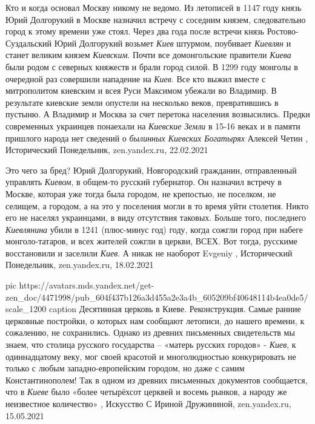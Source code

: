 Кто и когда основал Москву никому не ведомо. Из летописей в 1147 году
князь Юрий Долгорукий в Москве назначил встречу с соседним князем,
следовательно город к этому времени уже стоял. Через два года после встречи
князь Ростово-Суздальский Юрий Долгорукий возьмет \emph{Киев} штурмом, поубивает
\emph{Киевлян} и станет великим князем \emph{Киевским}. Почти все домонгольские правители
\emph{Киева} были родом с северных княжеств и брали город силой.  В 1299 году монголы
в очередной раз совершили нападение на \emph{Киев}. Все кто выжил вместе с
митрополитом киевским и всея Руси Максимом убежали во Владимир. В результате
киевские земли опустели на несколько веков, превратившись в пустыню.  А
Владимир и Москва за счет перетока населения возвысились. Предки современных
украинцев понаехали на \emph{Киевские Земли} в 15-16 веках и в памяти пришлого народа
нет сведений о \emph{былинных Киевских Богатырях}
Алексей Четин
, 
Исторический Понедельник, zen.yandex.ru, 22.02.2021

Это чего за бред? Юрий Долгорукий, Новгородский гражданин, отправленный
управлять \emph{Киевом}, в общем-то русский губернатор. Он назначил встречу в
Москве, которая уже тогда была городом, не крепостью, не поселком, не селищем,
а городом, а на это у поселения могли в то время уйти столетия. Никто его не
населял украинцами, в виду отсутствия таковых. Больше того, последнего
\emph{Киевлянина} убили в 1241 (плюс-минус год) году, когда сожгли город при
набеге монголо-татаров, и всех жителей сожгли в церкви, ВСЕХ. Вот тогда,
русскиме восстановили и заселили \emph{Киев}. А никак не наоборот
Evgeniy
, 
Исторический Понедельник, zen.yandex.ru, 18.02.2021

\ifcmt
  pic https://avatars.mds.yandex.net/get-zen_doc/4471998/pub_604f437b126a3d455a2e3a4b_605209bf40648114b4ea0de5/scale_1200
  caption Десятинная церковь в Киеве. Реконструкция.
\fi
Самые ранние церковные постройки, о которых нам сообщают летописи, до нашего
времени, к сожалению, не сохранились. Однако из древних письменных свидетельств
мы знаем, что столица русского государства – «матерь русских городов» - \emph{Киев}, к
одиннадцатому веку, мог своей красотой и многолюдностью конкурировать не только
с любым западно-европейским городом, но даже с самим Константинополем! Так в
одном из древних письменных документов сообщается, что в \emph{Киеве} было «более
четырёхсот церквей и восемь рынков, а народу же неизвестное количество»
, 
Искусство С Ириной Дружининой, zen.yandex.ru, 15.05.2021

